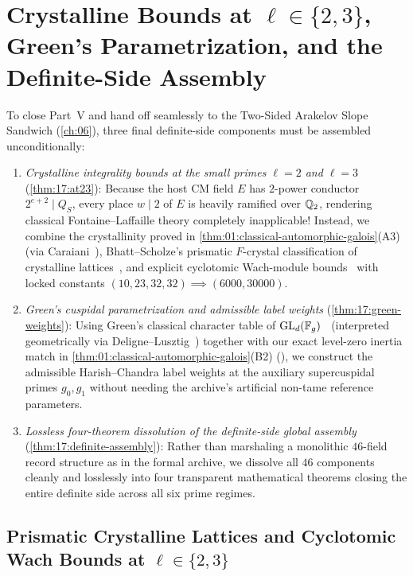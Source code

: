 \chapter{Crystalline Bounds at $\ell \in \{2, 3\}$, Green's Parametrization, and the Definite-Side Assembly}
\label{ch:17}

To close Part~V and hand off seamlessly to the Two-Sided Arakelov Slope Sandwich (\cref{ch:06}), three final definite-side components must be assembled unconditionally:
\begin{enumerate}[label=(\roman*)]
\item \emph{Crystalline integrality bounds at the small primes $\ell = 2$ and $\ell = 3$} (\cref{thm:17:at23}): Because the host CM field $E$ has $2$-power conductor $2^{e+2} \mid Q_S$, every place $w \mid 2$ of $E$ is heavily ramified over $\mathbb{Q}_2$, rendering classical Fontaine--Laffaille theory completely inapplicable! Instead, we combine the crystallinity proved in \cref{thm:01:classical-automorphic-galois}(A3) (via Caraiani~\cite{Caraiani2014}), Bhatt--Scholze's prismatic $F$-crystal classification of crystalline lattices~\cite[Theorem~5.6]{BhattScholze2023}, and explicit cyclotomic Wach-module bounds~\cite{Berger2004} with locked constants $(10, 23, 32, 32) \implies (6000, 30000)$.
\item \emph{Green's cuspidal parametrization and admissible label weights} (\cref{thm:17:green-weights}): Using Green's classical character table of $\mathrm{GL}_d(\mathbb{F}_g)$~\cite{Green1955} (interpreted geometrically via Deligne--Lusztig~\cite{DeligneLusztig1976}) together with our exact level-zero inertia match in \cref{thm:01:classical-automorphic-galois}(B2) (\cite{BushnellHenniart2005,BushnellHenniart2011}), we construct the admissible Harish--Chandra label weights at the auxiliary supercuspidal primes $g_0, g_1$ without needing the archive's artificial non-tame reference parameters.
\item \emph{Lossless four-theorem dissolution of the definite-side global assembly} (\cref{thm:17:definite-assembly}): Rather than marshaling a monolithic $46$-field record structure as in the formal archive, we dissolve all $46$ components cleanly and losslessly into four transparent mathematical theorems closing the entire definite side across all six prime regimes.
\end{enumerate}

\section{Prismatic Crystalline Lattices and Cyclotomic Wach Bounds at $\ell \in \{2, 3\}$}
\label{sec:17:at23}

